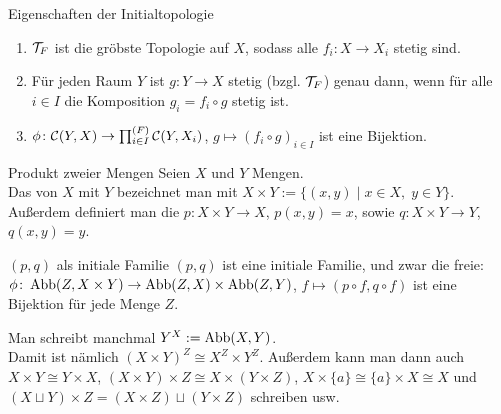\begin{Satz}{Eigenschaften der Initialtopologie}
    \begin{enumerate}
        \item
        $\mathcal{T}_F$ ist die gröbste Topologie auf $X$, sodass alle
        $f_i\colon X \rightarrow X_i$ stetig sind.

        \item
        Für jeden Raum $Y$ ist $g\colon Y \rightarrow X$ stetig (bzgl. $\mathcal{T}_F$)
        genau dann, wenn für alle $i \in I$ die Komposition
        $g_i = f_i \circ g$ stetig ist.

        \item
        $\phi\colon \mathcal{C}(Y, X) \rightarrow
        \prod_{i \in I}^{(F)} \mathcal{C}(Y, X_i)$, $g \mapsto (f_i \circ g)_{i \in I}$
        ist eine Bijektion.
    \end{enumerate}
\end{Satz}

\linie

\begin{Def}{Produkt zweier Mengen}
    Seien $X$ und $Y$ Mengen. \\
    Das  von $X$ mit $Y$ bezeichnet man mit
    $X \times Y := \{(x, y) \;|\; x \in X,\; y \in Y\}$. \\
    Außerdem definiert man die 
    $p\colon X \times Y \rightarrow X$, $p(x, y) = x$,
    sowie $q\colon X \times Y \rightarrow Y$, $q(x, y) = y$.
\end{Def}

\begin{Satz}{$(p, q)$ als initiale Familie}
    $(p, q)$ ist eine initiale Familie,
    und zwar die freie: \\
    $\phi\colon \operatorname{Abb}(Z, X \times Y) \rightarrow \operatorname{Abb}(Z, X) \times \operatorname{Abb}(Z, Y)$,
    $f \mapsto (p \circ f, q \circ f)$ ist eine Bijektion für jede Menge $Z$.
\end{Satz}

\begin{Bem}
    Man schreibt manchmal $Y^X := \operatorname{Abb}(X, Y)$. \\
    Damit ist nämlich $(X \times Y)^Z \cong X^Z \times Y^Z$.
    Außerdem kann man dann auch $X \times Y \cong Y \times X$,
    $(X \times Y) \times Z \cong X \times (Y \times Z)$,
    $X \times \{a\} \cong \{a\} \times X \cong X$ und
    $(X \sqcup Y) \times Z = (X \times Z) \sqcup (Y \times Z)$ schreiben usw.
\end{Bem}

\linie

